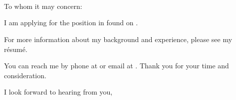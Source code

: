 \begin{letter}{
    \vCompanyName{}\\
    \vCompanyAddress{}
}
    \begin{center}
        \vMyName{}\\
        \vMyAddress{}\\
        \vMyPhone{}
    \end{center}

    \signature{\vMySignature{}}

    \opening{To whom it may concern:}

    I am applying for the \vJobPosition{} position in \vJobDepartment{} found on \vJobFound{}.

    \vJobBody{}

    For more information about my background and experience, please see my r\'esum\'e.

    You can reach me by phone at \vMyPhone{} or email at \vMyEmail{}.  Thank you for your time and consideration.

    \addtolength{\medskipamount}{-.95\medskipamount}
    \closing{I look forward to hearing from you,}
    \addtolength{\medskipamount}{19\medskipamount}
\end{letter}
